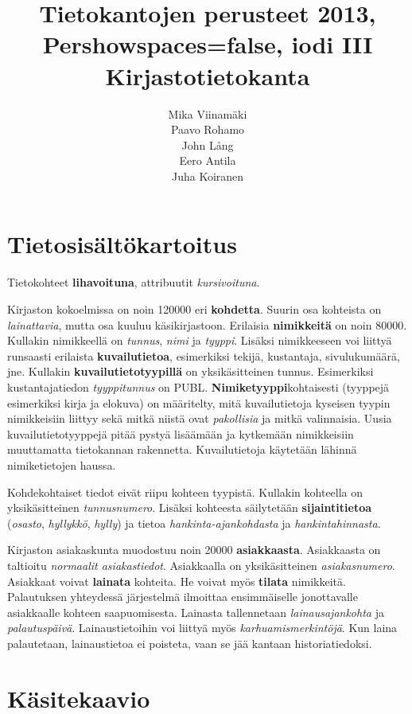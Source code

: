 \documentclass{article}
\title{Tietokantojen perusteet 2013, Pershowspaces=false,   iodi III \\ Kirjastotietokanta}
\author{Mika Viinamäki \\ Paavo Rohamo \\ John Lång \\ Eero Antila \\ Juha Koiranen}
\begin{document}
\maketitle 

\section{Tietosisältökartoitus}

Tietokohteet \textbf{lihavoituna}, attribuutit \textit{kursivoituna}.

Kirjaston kokoelmissa on noin 120000 eri \textbf{kohdetta}. Suurin osa kohteista on \textit{lainattavia}, mutta osa kuuluu käsikirjastoon. Erilaisia \textbf{nimikkeitä} on noin 80000. Kullakin nimikkeellä on \textit{tunnus}, \textit{nimi} ja \textit{tyyppi}. Lisäksi nimikkeeseen voi liittyä runsaasti erilaista \textbf{kuvailutietoa}, esimerkiksi tekijä, kustantaja, sivulukumäärä, jne. Kullakin \textbf{kuvailutietotyypillä} on yksikäsitteinen tunnus. Esimerkiksi kustantajatiedon \textit{tyyppitunnus} on PUBL. \textbf{Nimiketyyppi}kohtaisesti (tyyppejä esimerkiksi kirja ja elokuva) on määritelty, mitä kuvailutietoja kyseisen tyypin nimikkeisiin liittyy sekä mitkä niistä ovat \textit{pakollisia} ja mitkä valinnaisia. Uusia kuvailutietotyyppejä pitää pystyä lisäämään ja kytkemään nimikkeisiin muuttamatta tietokannan rakennetta. Kuvailutietoja käytetään lähinnä nimiketietojen haussa.

Kohdekohtaiset tiedot eivät riipu kohteen tyypistä. Kullakin kohteella on yksikäsitteinen \textit{tunnusnumero}. Lisäksi kohteesta säilytetään \textbf{sijaintitietoa} (\textit{osasto}, \textit{hyllykkö}, \textit{hylly}) ja tietoa \textit{hankinta-ajankohdasta} ja \textit{hankintahinnasta}.

Kirjaston asiakaskunta muodostuu noin 20000 \textbf{asiakkaasta}. Asiakkaasta on taltioitu \emph{normaalit asiakastiedot}. Asiakkaalla on yksikäsitteinen \emph{asiakasnumero}. Asiakkaat voivat \textbf{lainata} kohteita. He voivat myös \textbf{tilata} nimikkeitä. Palautuksen yhteydessä järjestelmä ilmoittaa ensimmäiselle jonottavalle asiakkaalle kohteen saapuomisesta. Lainasta tallennetaan \emph{lainausajankohta} ja \emph{palautuspäivä}. Lainaustietoihin voi liittyä myös \emph{karhuamismerkintöjä}. Kun laina palautetaan, lainaustietoa ei poisteta, vaan se jää kantaan historiatiedoksi. 

\section{Käsitekaavio}
\end{document}
